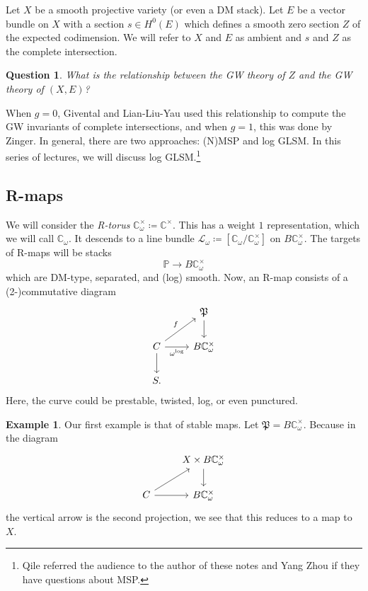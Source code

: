 \documentclass{amsart}
\newtheorem{quest}[thm]{Question}
\theoremstyle{definition}
\newtheorem{exm}[thm]{Example}
\theoremstyle{remark}
\theoremstyle{plain}
\theoremstyle{definition}
\theoremstyle{remark}
\newcommand{\C}{\mathbb{C}}
\renewcommand{\P}{\mathbb{P}}
\newcommand{\mc}[1]{\mathcal{#1}}
\newcommand{\mf}[1]{\mathfrak{#1}}
\newcommand{\1}{\mathbf{1}}
\newcommand{\2}{\mathbf{2}}
\newcommand{\3}{\mathbf{3}}
\begin{document}
Let \(X\) be a smooth projective variety (or even a DM stack). Let \(E\) be a vector bundle on \(X\) with a section \(s \in H^0(E)\) which defines a smooth zero section \(Z\) of the expected codimension. We will refer to \(X\) and \(E\) as ambient and \(s\) and \(Z\) as the complete intersection.

\begin{quest}
    What is the relationship between the GW theory of \(Z\) and the GW theory of \((X, E)\)?
\end{quest}

When \(g = 0\), Givental and Lian-Liu-Yau used this relationship to compute the GW invariants of complete intersections, and when \(g = 1\), this was done by Zinger. In general, there are two approaches: (N)MSP and log GLSM. In this series of lectures, we will discuss log GLSM.\footnote{Qile referred the audience to the author of these notes and Yang Zhou if they have questions about MSP.}

\subsection{R-maps}%
\label{sub:R-maps}

We will consider the \textit{R-torus} \(\C^{\times}_{\omega} \coloneqq \C^{\times}\). This has a weight \(1\) representation, which we will call \(\C_{\omega}\). It descends to a line bundle \(\mc{L}_{\omega} \coloneqq [\C_{\omega} / \C^{\times}_{\omega}]\) on \(B \C_{\omega}^{\times}\). The targets of R-maps will be stacks
\[ \P \to B \C^{\times}_{\omega} \]
which are DM-type, separated, and (log) smooth. Now, an R-map consists of a (2-)commutative diagram
\begin{equation*}
\begin{tikzcd}
    & \mf{P} \ar{d} \\
    C \ar{ur}{f} \ar{r}[swap]{\omega^{\log}} \ar{d} & B \C_{\omega}^{\times} \\
    S.
\end{tikzcd}
\end{equation*}
Here, the curve could be prestable, twisted, log, or even punctured.

\begin{exm}
    Our first example is that of stable maps. Let \(\mf{P} = B\C_{\omega}^{\times}\). Because in the diagram
    \begin{equation*}
    \begin{tikzcd}
        & X \times B\C_{\omega}^{\times} \ar{d} \\
        C \ar{ur} \ar{r} & B \C_{\omega}^{\times}
    \end{tikzcd}
    \end{equation*}
    the vertical arrow is the second projection, we see that this reduces to a map to \(X\).
\end{exm}
\end{document}
